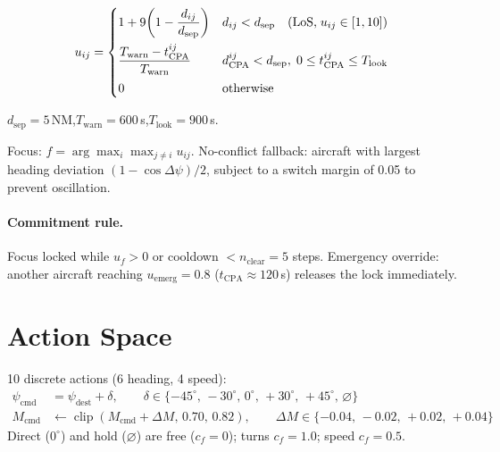 \documentclass[11pt, a4paper]{article}
\begin{document}
\begin{equation}
    u_{ij} =
    \begin{cases}
        1 + 9\!\left(1 - \dfrac{d_{ij}}{d_\text{sep}}\right)
            & d_{ij} < d_\text{sep}
              \quad\text{(LoS,\;} u_{ij}\in[1,10]\text{)} \\[10pt]
        \dfrac{T_\text{warn} - t_\text{CPA}^{ij}}{T_\text{warn}}
            & d_\text{CPA}^{ij} < d_\text{sep},\;
              0 \leq t_\text{CPA}^{ij} \leq T_\text{look} \\[8pt]
        0   & \text{otherwise}
    \end{cases}
    \label{eq:urgency}
\end{equation}

$d_\text{sep}=5$\,NM,\quad $T_\text{warn}=600$\,s,\quad $T_\text{look}=900$\,s.

Focus: $f = \arg\max_i \max_{j\neq i} u_{ij}$.
No-conflict fallback: aircraft with largest heading deviation $(1-\cos\Delta\psi)/2$,
subject to a switch margin of 0.05 to prevent oscillation.

\paragraph{Commitment rule.}
Focus locked while $u_f>0$ or cooldown $< n_\text{clear}=5$ steps.
Emergency override: another aircraft reaching $u_\text{emerg}=0.8$
($t_\text{CPA}\approx120$\,s) releases the lock immediately.

\section{Action Space}

10 discrete actions (6 heading, 4 speed):
\begin{align}
    \psi_\text{cmd} &= \psi_\text{dest} + \delta,\qquad
    \delta \in \{-45^\circ,\,-30^\circ,\,0^\circ,\,+30^\circ,\,+45^\circ,\,\varnothing\} \\
    M_\text{cmd} &\leftarrow \operatorname{clip}(M_\text{cmd}+\Delta M,\,0.70,\,0.82),\qquad
    \Delta M \in \{-0.04,\,-0.02,\,+0.02,\,+0.04\}
\end{align}
Direct ($0^\circ$) and hold ($\varnothing$) are free ($c_f=0$); turns $c_f=1.0$; speed $c_f=0.5$.

\end{document}
